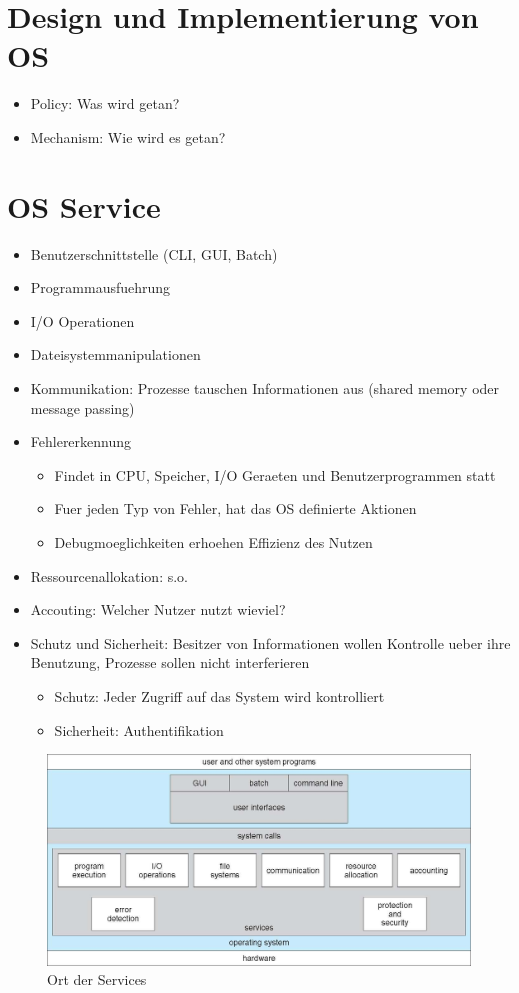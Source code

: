 \documentclass[a4paper]{scrreprt}
\begin{document}
\section{Design und Implementierung von OS}
\begin{itemize}
	\item Policy: Was wird getan?
	\item Mechanism: Wie wird es getan?
\end{itemize}

\section{OS Service}
\begin{itemize}
	\item Benutzerschnittstelle (CLI, GUI, Batch)
	\item Programmausfuehrung
	\item I/O Operationen
	\item Dateisystemmanipulationen
	\item Kommunikation: Prozesse tauschen Informationen aus (shared memory oder message passing)
	\item Fehlererkennung
		\begin{itemize}
			\item Findet in CPU, Speicher, I/O Geraeten und Benutzerprogrammen statt
			\item Fuer jeden Typ von Fehler, hat das OS definierte Aktionen
			\item Debugmoeglichkeiten erhoehen Effizienz des Nutzen
		\end{itemize}
	\item Ressourcenallokation: s.o.
	\item Accouting: Welcher Nutzer nutzt wieviel?
	\item Schutz und Sicherheit: Besitzer von Informationen wollen Kontrolle ueber ihre Benutzung, Prozesse sollen nicht interferieren
		\begin{itemize}
			\item Schutz: Jeder Zugriff auf das System wird kontrolliert
			\item Sicherheit: Authentifikation
		\end{itemize}
\end{itemize}

\begin{figure}[ht]
\centering
\includegraphics[scale=0.35]{graphics/services.png}
\caption{Ort der Services}
\end{figure}
\end{document}
